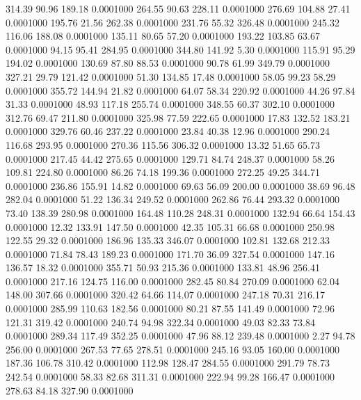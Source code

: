  314.39   90.96  189.18   0.0001000
 264.55   90.63  228.11   0.0001000
 276.69  104.88   27.41   0.0001000
 195.76   21.56  262.38   0.0001000
 231.76   55.32  326.48   0.0001000
 245.32  116.06  188.08   0.0001000
 135.11   80.65   57.20   0.0001000
 193.22  103.85   63.67   0.0001000
  94.15   95.41  284.95   0.0001000
 344.80  141.92    5.30   0.0001000
 115.91   95.29  194.02   0.0001000
 130.69   87.80   88.53   0.0001000
  90.78   61.99  349.79   0.0001000
 327.21   29.79  121.42   0.0001000
  51.30  134.85   17.48   0.0001000
  58.05   99.23   58.29   0.0001000
 355.72  144.94   21.82   0.0001000
  64.07   58.34  220.92   0.0001000
  44.26   97.84   31.33   0.0001000
  48.93  117.18  255.74   0.0001000
 348.55   60.37  302.10   0.0001000
 312.76   69.47  211.80   0.0001000
 325.98   77.59  222.65   0.0001000
  17.83  132.52  183.21   0.0001000
 329.76   60.46  237.22   0.0001000
  23.84   40.38   12.96   0.0001000
 290.24  116.68  293.95   0.0001000
 270.36  115.56  306.32   0.0001000
  13.32   51.65   65.73   0.0001000
 217.45   44.42  275.65   0.0001000
 129.71   84.74  248.37   0.0001000
  58.26  109.81  224.80   0.0001000
  86.26   74.18  199.36   0.0001000
 272.25   49.25  344.71   0.0001000
 236.86  155.91   14.82   0.0001000
  69.63   56.09  200.00   0.0001000
  38.69   96.48  282.04   0.0001000
  51.22  136.34  249.52   0.0001000
 262.86   76.44  293.32   0.0001000
  73.40  138.39  280.98   0.0001000
 164.48  110.28  248.31   0.0001000
 132.94   66.64  154.43   0.0001000
  12.32  133.91  147.50   0.0001000
  42.35  105.31   66.68   0.0001000
 250.98  122.55   29.32   0.0001000
 186.96  135.33  346.07   0.0001000
 102.81  132.68  212.33   0.0001000
  71.84   78.43  189.23   0.0001000
 171.70   36.09  327.54   0.0001000
 147.16  136.57   18.32   0.0001000
 355.71   50.93  215.36   0.0001000
 133.81   48.96  256.41   0.0001000
 217.16  124.75  116.00   0.0001000
 282.45   80.84  270.09   0.0001000
  62.04  148.00  307.66   0.0001000
 320.42   64.66  114.07   0.0001000
 247.18   70.31  216.17   0.0001000
 285.99  110.63  182.56   0.0001000
  80.21   87.55  141.49   0.0001000
  72.96  121.31  319.42   0.0001000
 240.74   94.98  322.34   0.0001000
  49.03   82.33   73.84   0.0001000
 289.34  117.49  352.25   0.0001000
  47.96   88.12  239.48   0.0001000
   2.27   94.78  256.00   0.0001000
 267.53   77.65  278.51   0.0001000
 245.16   93.05  160.00   0.0001000
 187.36  106.78  310.42   0.0001000
 112.98  128.47  284.55   0.0001000
 291.79   78.73  242.54   0.0001000
  58.33   82.68  311.31   0.0001000
 222.94   99.28  166.47   0.0001000
 278.63   84.18  327.90   0.0001000
